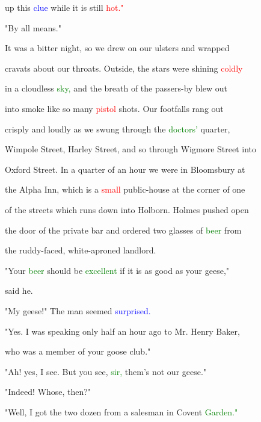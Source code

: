  up this \textcolor{blue}{clue} while it is still \textcolor{red}{hot."}



 "By all means."



 It was a bitter night, so we drew on our ulsters and wrapped

 cravats about our throats. Outside, the \textcolor{BurntOrange}{stars} were shining \textcolor{red}{coldly}

 in a cloudless \textcolor{green}{sky,} and the breath of the passers-by blew out

 into smoke like so many \textcolor{red}{pistol} \textcolor{BurntOrange}{shots.} Our footfalls rang out

 crisply and loudly as we swung through the \textcolor{green}{doctors'} quarter,

 Wimpole Street, Harley Street, and so through Wigmore Street into

 Oxford Street. In a quarter of an hour we were in Bloomsbury at

 the Alpha Inn, which is a \textcolor{red}{small} public-house at the corner of one

 of the streets which runs down into Holborn. Holmes pushed open

 the door of the private bar and ordered two glasses of \textcolor{green}{beer} from

 the ruddy-faced, white-aproned landlord.



 "Your \textcolor{green}{beer} should be \textcolor{green}{excellent} if it is as \textcolor{BurntOrange}{good} as your geese,"

 said he.



 "My geese!" The man seemed \textcolor{blue}{surprised.}



 "Yes. I was speaking only half an hour ago to Mr. Henry Baker,

 who was a member of your goose club."



 "Ah! yes, I see. But you see, \textcolor{green}{sir,} them's not our geese."



 "Indeed! Whose, then?"



 "Well, I got the two dozen from a salesman in Covent \textcolor{green}{Garden."}



